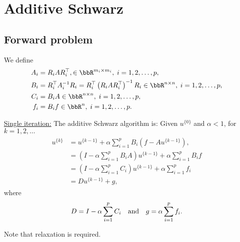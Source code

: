 \section{Additive Schwarz}
\label{sec:Additive_Schwarz}

\subsection{Forward problem}
\label{sec:AS_forward_problem}

We define
\begin{equation}
\label{eq:ABCf2}
\begin{gathered}\begin{aligned}
A_i &= R_i A R_i^\top, \in \bbR^{m_i \times m_i}, \; i = 1, 2, \dots, p, \\
B_i &= R_i^\top A_i^{-1} R_i
     = R_i^\top \left( R_i A R_i^\top \right)^{-1} R_i \in \bbR^{n \times n}, \; i = 1, 2, \dots, p, \\
C_i &= B_i A \in \bbR^{n \times n}, \; i = 1, 2, \dots, p, \\
f_i &= B_i f \in \bbR^n, \; i = 1, 2, \dots, p.
\end{aligned}\end{gathered}
\end{equation}

\bigskip
\noindent\underline{Single iteration:} \quad
The additive Schwarz algorithm is: Given $u^{\{0\}}$ and $\alpha < 1$, for $k = 1, 2,  \dots$
\begin{equation}
\label{eq:additive_Schwarz_basic}
\begin{gathered}\begin{aligned}
u^{\{k\}} &= u^{\{k-1\}} + \alpha \sum_{i=1}^p B_i \left( f - A u^{\{k-1\}} \right),   \\
&= \left( I - \alpha \sum_{i=1}^p B_i A \right) u^{\{k-1\}} + \alpha \sum_{i=1}^p B_i f \\
&= \left( I - \alpha \sum_{i=1}^p C_i \right) u^{\{k-1\}} + \alpha \sum_{i=1}^p f_i \\
&= D u^{\{k-1\}} + g,
\end{aligned}\end{gathered}
\end{equation}
where
\begin{equation}
D= I - \alpha \sum_{i=1}^p C_i \quad\hbox{and}\quad g= \alpha \sum_{i=1}^p f_i.
\end{equation}


Note that relaxation is required.

